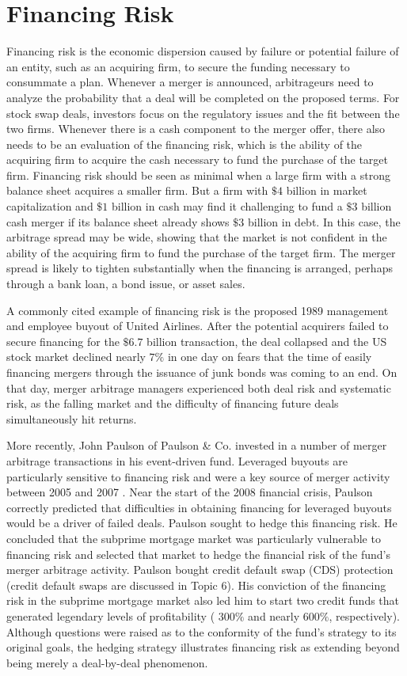 \documentclass[11pt]{article}
\begin{document}
\section*{Financing Risk}
Financing risk is the economic dispersion caused by failure or potential failure of an entity, such as an acquiring firm, to secure the funding necessary to consummate a plan. Whenever a merger is announced, arbitrageurs need to analyze the probability that a deal will be completed on the proposed terms. For stock swap deals, investors focus on the regulatory issues and the fit between the two firms. Whenever there is a cash component to the merger offer, there also needs to be an evaluation of the financing risk, which is the ability of the acquiring firm to acquire the cash necessary to fund the purchase of the target firm. Financing risk should be seen as minimal when a large firm with a strong balance sheet acquires a smaller firm. But a firm with $\$ 4$ billion in market capitalization and $\$ 1$ billion in cash may find it challenging to fund a $\$ 3$ billion cash merger if its balance sheet already shows $\$ 3$ billion in debt. In this case, the arbitrage spread may be wide, showing that the market is not confident in the ability of the acquiring firm to fund the purchase of the target firm. The merger spread is likely to tighten substantially when the financing is arranged, perhaps through a bank loan, a bond issue, or asset sales.

A commonly cited example of financing risk is the proposed 1989 management and employee buyout of United Airlines. After the potential acquirers failed to secure financing for the $\$ 6.7$ billion transaction, the deal collapsed and the US stock market declined nearly $7 \%$ in one day on fears that the time of easily financing mergers through the issuance of junk bonds was coming to an end. On that day, merger arbitrage managers experienced both deal risk and systematic risk, as the falling market and the difficulty of financing future deals simultaneously hit returns.

More recently, John Paulson of Paulson \& Co. invested in a number of merger arbitrage transactions in his event-driven fund. Leveraged buyouts are particularly sensitive to financing risk and were a key source of merger activity between 2005 and 2007 . Near the start of the 2008 financial crisis, Paulson correctly predicted that difficulties in obtaining financing for leveraged buyouts would be a driver of failed deals. Paulson sought to hedge this financing risk. He concluded that the subprime mortgage market was particularly vulnerable to financing risk and selected that market to hedge the financial risk of the fund's merger arbitrage activity. Paulson bought credit default swap (CDS) protection (credit default swaps are discussed in Topic 6). His conviction of the financing risk in the subprime mortgage market also led him to start two credit funds that generated legendary levels of profitability ( $300 \%$ and nearly $600 \%$, respectively). Although questions were raised as to the conformity of the fund's strategy to its original goals, the hedging strategy illustrates financing risk as extending beyond being merely a deal-by-deal phenomenon.
\end{document}
